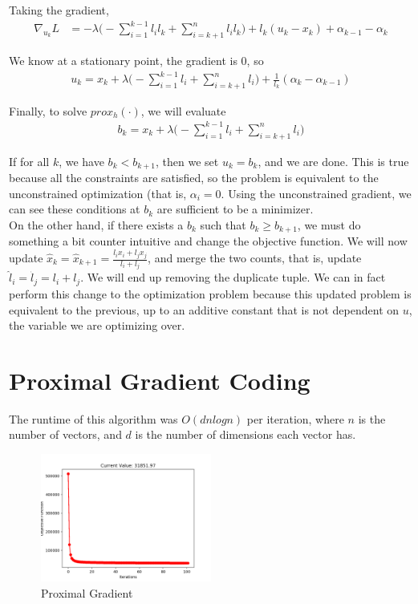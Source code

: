 \documentclass[a4paper]{article}
\begin{document}
Taking the gradient,
\begin{align}
\nabla_{u_k} L &= -\lambda \Big( -\sum_{i=1}^{k-1} l_i l_k + \sum_{i=k+1}^n l_i l_k \Big) + l_k (u_k - x_k) + \alpha_{k-1} - \alpha_k
\end{align}

We know at a stationary point, the gradient is $0$, so
\begin{align}
u_k = x_k + \lambda \Big (-\sum_{i=1}^{k-1} l_i + \sum_{i=k+1}^n l_i \Big) + \frac{1}{l_k} (\alpha_k - \alpha_{k-1})
\end{align}

Finally, to solve $prox_h(\cdot)$, we will evaluate
\begin{align}
b_k = x_k + \lambda \Big (-\sum_{i=1}^{k-1} l_i + \sum_{i=k+1}^n l_i \Big)
\end{align}

If for all $k$, we have $b_k < b_{k+1}$, then we set $u_k = b_k$, and we are done. This is true because all the constraints are satisfied, so the problem is equivalent to the unconstrained optimization (that is, $\alpha_i = 0$. Using the unconstrained gradient, we can see these conditions at $b_k$ are sufficient to be a minimizer. \\

On the other hand, if there exists a $b_k$ such that $b_k \geq b_{k+1}$, we must do something a bit counter intuitive and change the objective function. We will now update $\hat x_k = \hat x_{k+1} = \frac{l_i x_i + l_j x_j}{l_i + l_j}$, and merge the two counts, that is, update $\hat l_i = \hat l_j = l_i + l_j$. We will end up removing the duplicate tuple. We can in fact perform this change to the optimization problem because this updated problem is equivalent to the previous, up to an additive constant that is not dependent on $u$, the variable we are optimizing over.

\pagebreak

\section{Proximal Gradient Coding}
The runtime of this algorithm was $O(d n log n)$ per iteration, where $n$ is the number of vectors, and $d$ is the number of dimensions each vector has.
\begin{figure}[!h]
\centering
\includegraphics[width=0.5\textwidth]{cs395t_graphics_hw4_prox.png}
\caption{Proximal Gradient}
\end{figure}
\end{document}
